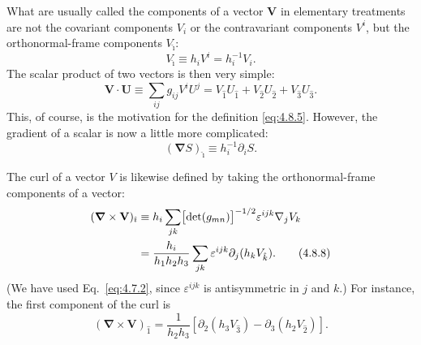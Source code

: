 What are usually called the components of a vector \(\mathbf V\) in
elementary treatments are not the covariant components \(V_i\) or the
contravariant components \(V^i\), but the orthonormal-frame components
\(V_{\hat\imath}\):
\begin{equation}
  V_{\hat\imath}
  \equiv
  h_iV^i
  =
  h_i^{-1}V_i.
  \tag{4.8.5}\label{eq:4.8.5}
\end{equation}
The scalar product of two vectors is then very simple:
\begin{equation}
  \mathbf V\mathbin{\cdot}\mathbf U
  \equiv
  \sum_{ij}g_{ij}V^iU^j
  =
  V_{\hat1}U_{\hat1}+V_{\hat2}U_{\hat2}+V_{\hat3}U_{\hat3}.
  \tag{4.8.6}\label{eq:4.8.6}
\end{equation}
This, of course, is the motivation for the definition
\eqref{eq:4.8.5}. However, the gradient of a scalar is now a little more
complicated:
\begin{equation}
  (\bm\nabla S)_{\hat\imath}
  \equiv
  h_i^{-1}\partial_iS.
  \tag{4.8.7}\label{eq:4.8.7}
\end{equation}

The curl of a vector \(V\) is likewise defined by taking the orthonormal-frame
components of a vector:
\begin{align}
  (\bm\nabla\times\mathbf V)_{\hat\imath}
  &\equiv
  h_i\sum_{jk}\bigl[\det(g_{mn})\bigr]^{-1/2}
  \varepsilon^{ijk}\nabla_jV_k
  \notag\\
  &=
  \frac{h_i}{h_1h_2h_3}
  \sum_{jk}\varepsilon^{ijk}\partial_j(h_kV_{\hat k}).
  \tag{4.8.8}\label{eq:4.8.8}
\end{align}
(We have used Eq.~\eqref{eq:4.7.2}, since \(\varepsilon^{ijk}\) is
antisymmetric in \(j\) and \(k\).) For instance, the first component of the
curl is
\begin{equation}
  (\bm\nabla\times\mathbf V)_{\hat1}
  =
  \frac{1}{h_2h_3}
  \left[
    \partial_2(h_3V_{\hat3})
    -\partial_3(h_2V_{\hat2})
  \right].
  \tag{4.8.9}\label{eq:4.8.9}
\end{equation}

